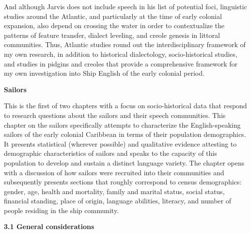 \begin{styleStandard}
And although Jarvis does not include speech in his list of potential foci, linguistic studies around the Atlantic, and particularly at the time of early colonial expansion, also depend on crossing the water in order to contextualize the patterns of feature transfer, dialect leveling, and creole genesis in littoral communities. Thus, Atlantic studies round out the interdisciplinary framework of my own research, in addition to historical dialectology, socio-historical studies, and studies in pidgins and creoles that provide a comprehensive framework for my own investigation into Ship English of the early colonial period. 
\end{styleStandard}


\setcounter{listWWNumxivleveli}{2}
\begin{listWWNumxivleveli}
\item 
\clearpage\begin{styleListParagraph}
\textbf{Sailors}
\end{styleListParagraph}

\end{listWWNumxivleveli}
\begin{styleStandard}
This is the first of two chapters with a focus on socio-historical data that respond to research questions about the sailors and their speech communities. This chapter on the sailors specifically attempts to characterize the English-speaking sailors of the early colonial Caribbean in terms of their population demographics. It presents statistical (wherever possible) and qualitative evidence attesting to demographic characteristics of sailors and speaks to the capacity of this population to develop and sustain a distinct language variety. The chapter opens with a discussion of how sailors were recruited into their communities and subsequently presents sections that roughly correspond to census demographics: gender, age, health and mortality, family and marital status, social status, financial standing, place of origin, language abilities, literacy, and number of people residing in the ship community. 
\end{styleStandard}


\begin{styleStandard}
\textbf{3.1 General considerations}
\end{styleStandard}


